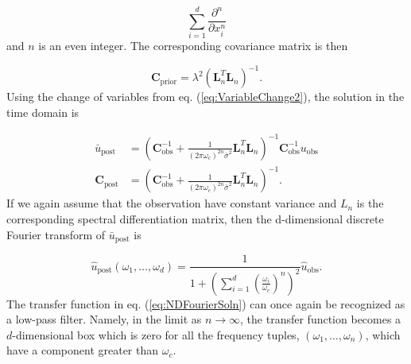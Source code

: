 \documentclass[10pt,a4paper]{article}
\begin{document}
\begin{equation}
  \sum_{i=1}^d\frac{\partial^n}{\partial x_i^n} 
\end{equation} 
and $n$ is an even integer. The corresponding covariance matrix is then

\begin{equation}\label{eq:NDCovariance}
\mathbf{C}_\mathrm{prior} = \lambda^2\left(\mathbf{L}_n^T\mathbf{L}_n\right)^{-1}. 
\end{equation}           
Using the change of variables from eq. (\ref{eq:VariableChange2}), the solution in the time domain is

\begin{equation}\label{eq:NDSolution}
\begin{split}
\bar{u}_\mathrm{post} &= (\mathbf{C}_\mathrm{obs}^{-1} +   
                   \frac{1}{(2\pi\omega_c)^{2n}\bar{\sigma}^2}\mathbf{L}_n^T\mathbf{L}_n)^{-1}\mathbf{C}_\mathrm{obs}^{-1}
                   u_\mathrm{obs}
\\
\mathbf{C}_\mathrm{post} &= (\mathbf{C}_\mathrm{obs}^{-1} +   
                            \frac{1}{(2\pi\omega_c)^{2n}\bar{\sigma}^2}\mathbf{L}_n^T\mathbf{L}_n)^{-1}.
\end{split}
\end{equation}
If we again assume that the observation have constant variance and $L_n$ is the corresponding spectral differentiation matrix, then the d-dimensional discrete Fourier transform of $\bar{u}_\mathrm{post}$ is 

\begin{equation}\label{eq:NDFourierSoln}
  \hat{u}_\mathrm{post}(\omega_1, \dots, \omega_d) = 
  \frac{1}{1 + \left(\sum_{i=1}^d \left(\frac{\omega_i}{\omega_c}\right)^n\right)^2} \hat{u}_\mathrm{obs}.
\end{equation}
The transfer function in eq. (\ref{eq:NDFourierSoln}) can once again be recognized as a low-pass filter.  Namely, in the limit as $n \to \infty$, the transfer function becomes a $d$-dimensional box which is zero for all the frequency tuples, $(\omega_1,\dots,\omega_n)$, which have a component greater than $\omega_c$. 


  
 
\end{document}
